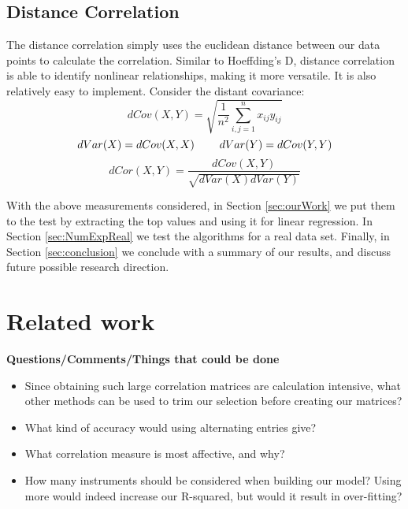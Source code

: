 \documentclass[10pt]{siamltex}
\begin{document}
\subsection{Distance Correlation}

The distance correlation simply uses the euclidean distance between our data points to calculate the correlation\cite{CorDist}. Similar to Hoeffding's D, distance correlation is able to identify nonlinear relationships, making it more versatile. It is also relatively easy to implement. Consider the distant covariance:
\begin{equation}
dCov(X,Y) = \sqrt{\frac{1}{n^2}\sum_{i,j=1}^nx_{ij}y_{ij}}
\end{equation}
\begin{equation}
dVar(X) = dCov(X,X) \hspace{8mm} dVar(Y) = dCov(Y,Y)
\end{equation}
\begin{equation}
dCor(X,Y) = \frac{dCov(X,Y)}{\sqrt{dVar(X)dVar(Y)}}
\end{equation}

With the above measurements considered, in Section \ref{sec:ourWork} we put them to the test by extracting the top values and using it for linear regression. 
In Section \ref{sec:NumExpReal} we test the algorithms for a real data set. Finally, in Section  \ref{sec:conclusion} we conclude with a summary of our results, and discuss future possible research direction. 



\section{Related work} \label{sec:relWork}

\textbf{Questions/Comments/Things that could be done}
\begin{itemize}
\item Since obtaining such large correlation matrices are calculation intensive, what other methods can be used to trim our selection before creating our matrices?
\item What kind of accuracy would using alternating entries give? 
\item What correlation measure is most affective, and why?
\item How many instruments should be considered when building our model? Using more would indeed increase our R-squared, but would it result in over-fitting?
\end{itemize}
\end{document}
